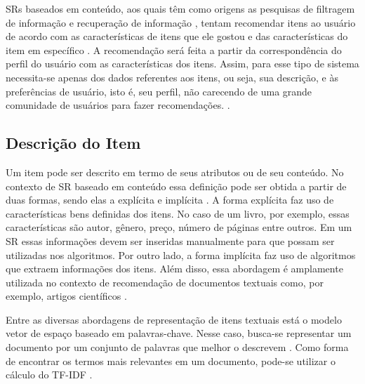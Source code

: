     SRs baseados em conteúdo, aos quais têm como origens as pesquisas de filtragem de informação e recuperação de informação \cite{Cazella2010}, tentam recomendar itens ao usuário de acordo com as características de itens que ele gostou e das características do item em específico \cite{Ricci2010}. A recomendação será feita a partir da correspondência do perfil do usuário com as características dos itens. Assim, para esse tipo de sistema necessita-se apenas dos dados referentes aos itens, ou seja, sua descrição, e às preferências de usuário, isto é, seu perfil, não carecendo de uma grande comunidade de usuários para fazer recomendações. \cite{Jannach2010}. 

    \subsection{Descrição do Item}
   
    Um item pode ser descrito em termo de seus atributos ou de seu conteúdo. No contexto de SR baseado em conteúdo essa definição pode ser obtida a partir de duas formas, sendo elas a explícita e implícita \cite{Jannach2010}. A forma explícita faz uso de características bens definidas dos itens. No caso de um livro, por exemplo, essas características são autor, gênero, preço, número de páginas entre outros. Em um SR essas informações devem ser inseridas manualmente para que possam ser utilizadas nos algoritmos. Por outro lado, a forma implícita faz uso de algoritmos que extraem informações dos itens. Além disso, essa abordagem é amplamente utilizada no contexto de recomendação de documentos textuais como, por exemplo, artigos científicos \cite{Garcia2013}.
    
    
    Entre as diversas abordagens de representação de itens textuais está o modelo vetor de espaço baseado em palavras-chave. Nesse caso, busca-se representar um documento por um conjunto de palavras que melhor o descrevem \cite{Jannach2010}. Como forma de encontrar os termos mais relevantes em um documento, pode-se utilizar o cálculo do TF-IDF \cite{Manning2008}.
    
    
    
